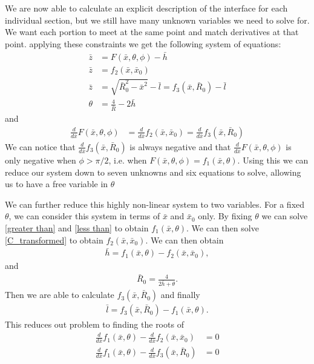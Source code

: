 We are now able to calculate an explicit description of the interface for each individual section, but we still have many unknown variables we need to solve for. We want each portion to meet at the same point and match derivatives at that point. applying these constraints we get the following system of equations:
\begin{align}
    \bar{z}&=F(\bar{x},\theta,\phi) - \bar{h} \\
    \bar{z}&=f_2(\bar{x},\bar{x}_0) \\
    \bar{z}&=\sqrt{\bar{R}_0^2-\bar{x}^2} - \bar{l}=f_3(\bar{x},\bar{R}_0)-\bar{l} \\
    \theta&=\frac{4}{\bar{R}}-2\bar{h}
\end{align}
and
\begin{align}
    \frac{d}{d\bar{x}}F(\bar{x},\theta,\phi)&=\frac{d}{d\bar{x}}f_2(\bar{x},\bar{x}_0) = \frac{d}{d\bar{x}}f_3(\bar{x},\bar{R}_0)
\end{align}
We can notice that $\frac{d}{d\bar{x}}f_3(\bar{x},\bar{R}_0)$ is always negative and that $\frac{d}{d\bar{x}}F(\bar{x},\theta,\phi)$ is only negative when $\phi>\pi/2$, i.e. when $F(\bar{x},\theta,\phi)=f_1(\bar{x},\theta)$. Using this we can reduce our system down to seven unknowns and six equations to solve, allowing us to have a free variable in $\theta$

We can further reduce this highly non-linear system to two variables. For a fixed $\theta$, we can consider this system in terms of $\bar{x}$ and $\bar{x}_0$ only. By fixing $\theta$ we can solve \ref{greater than} and \ref{less than} to obtain $f_1(\bar{x},\theta)$. We can then solve \ref{C_transformed} to obtain $f_2(\bar{x},\bar{x}_0)$. We can then obtain
\begin{align}
    \bar{h} = f_1(\bar{x},\theta) - f_2(\bar{x},\bar{x}_0),
\end{align}
and
\begin{align}
    \bar{R}_0=\frac{4}{2\bar{h} + \theta}.
\end{align}
Then we are able to calculate $f_3(\bar{x},\bar{R}_0)$ and finally
\begin{align}
    \bar{l} = f_3(\bar{x},\bar{R}_0)-f_1(\bar{x},\theta).
\end{align}
This reduces out problem to finding the roots of
\begin{align}\label{root 1}
    \frac{d}{d\bar{x}}f_1(\bar{x},\theta) -\frac{d}{d\bar{x}}f_2(\bar{x},\bar{x}_0) &=0 \\ \label{root 2}
    \frac{d}{d\bar{x}}f_1(\bar{x},\theta) - \frac{d}{d\bar{x}}f_3(\bar{x},\bar{R}_0) &=0
\end{align}
